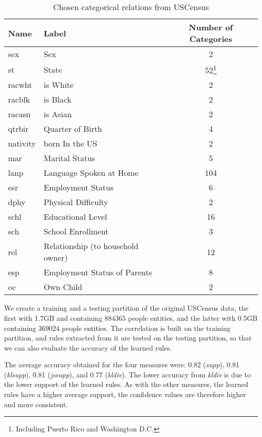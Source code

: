 \begin{table}[h!]
\begin{minipage}{\textwidth}
 \begin{center}
 \caption{Chosen categorical relations from USCensus}
  \begin{tabular}{l l c}
    \toprule
      Name	& Label				& Number of Categories \\
    \midrule
      sex	& Sex				&	2	\\
      st	& State				&	52\footnote{Including Puerto Rico and Washington D.C.}	\\
      racwht	& is White			&	2	\\
      racblk	& is Black			&	2	\\
      racasn	& is Asian			&	2	\\
      qtrbir	& Quarter of Birth		&	4	\\	
      nativity	& born In the US		&	2	\\
      mar	& Marital Status		&	5	\\
      lanp	& Language Spoken at Home	&	104	\\
      esr	& Employment Status		&	6	\\
      dphy	& Physical Difficulty		&	2	\\
      schl	& Educational Level		&	16	\\	
      sch	& School Enrollment		&	3	\\
      rel	& Relationship (to household owner)		&	12	\\
      esp	& Employment Status of Parents	&	8	\\
      oc	& Own Child			&	2	\\
    \bottomrule
  \end{tabular}
 \label{tab:uscensusRelations}
 \end{center}
\end{minipage}
\end{table}

We create a training and a testing partition of the original USCensus data, the first with 1.7GB and containing $884365$
people entities, and the latter with 0.5GB containing $369024$ people entities. The correlation is built on the
training partition, and rules extracted from it are tested on the testing partition, so that we can also evaluate the
accuracy of the learned rules.

The average accuracy obtained for the four measures were: 0.82 (\emph{supp}), 0.81 (\emph{klsupp}), 0.81
(\emph{jssupp}), and 0.77 (\emph{kldiv}). The lower accuracy from \emph{kldiv} is due to the lower support of the
learned rules. As with the other measures, the learned rules have a higher average support, the confidence values are
therefore higher and more consistent.

